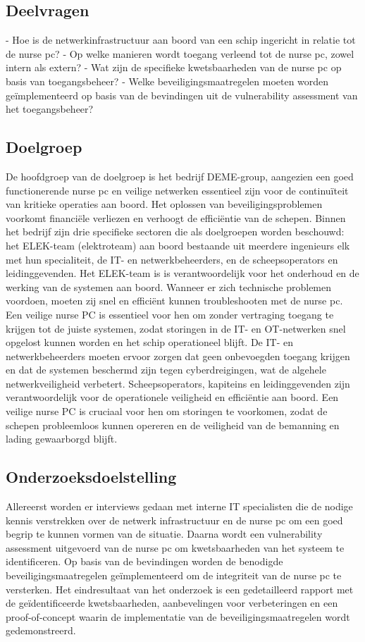 \subsection{Deelvragen}
- Hoe is de netwerkinfrastructuur aan boord van een schip ingericht in relatie tot de nurse pc?
- Op welke manieren wordt toegang verleend tot de nurse pc, zowel intern als extern?
- Wat zijn de specifieke kwetsbaarheden van de nurse pc op basis van toegangsbeheer?
- Welke beveiligingsmaatregelen moeten worden geïmplementeerd op basis van de bevindingen uit de vulnerability assessment van het toegangsbeheer?


\subsection{Doelgroep}
De hoofdgroep van de doelgroep is het bedrijf DEME-group, aangezien een goed functionerende nurse pc en veilige netwerken 
essentieel zijn voor de continuïteit van kritieke operaties aan boord. Het oplossen van beveiligingsproblemen voorkomt financiële verliezen en verhoogt de efficiëntie van de schepen.
Binnen het bedrijf zijn drie specifieke sectoren die als doelgroepen worden beschouwd: het ELEK-team (elektroteam) aan boord bestaande uit meerdere ingenieurs elk met hun specialiteit, de IT- en netwerkbeheerders, en de scheepsoperators en leidinggevenden.
Het ELEK-team is is verantwoordelijk voor het onderhoud en de werking van de systemen aan boord. Wanneer er zich technische problemen voordoen, moeten zij snel en efficiënt kunnen troubleshooten met de nurse pc.
Een veilige nurse PC is essentieel voor hen om zonder vertraging toegang te krijgen tot de juiste systemen, zodat storingen in de IT- en OT-netwerken snel opgelost kunnen worden en het schip operationeel blijft.
De IT- en netwerkbeheerders moeten ervoor zorgen dat geen onbevoegden toegang krijgen en dat de systemen beschermd zijn tegen cyberdreigingen, wat de algehele netwerkveiligheid verbetert.
Scheepsoperators, kapiteins en leidinggevenden zijn verantwoordelijk voor de operationele veiligheid en efficiëntie aan boord. Een veilige nurse PC is cruciaal voor hen om storingen te voorkomen, zodat de schepen probleemloos kunnen opereren en de 
veiligheid van de bemanning en lading gewaarborgd blijft.

\subsection{Onderzoeksdoelstelling}
Allereerst worden er interviews gedaan met interne IT specialisten die de nodige kennis verstrekken over de netwerk infrastructuur en de nurse pc om een goed begrip te kunnen vormen van de situatie. 
Daarna wordt een vulnerability assessment uitgevoerd van de nurse pc om kwetsbaarheden van het systeem te identificeren.
Op basis van de bevindingen worden de benodigde beveiligingsmaatregelen geïmplementeerd om de integriteit van de nurse pc te versterken.
Het eindresultaat van het onderzoek is een gedetailleerd rapport met de geïdentificeerde kwetsbaarheden, aanbevelingen voor verbeteringen en een proof-of-concept 
waarin de implementatie van de beveiligingsmaatregelen wordt gedemonstreerd.



